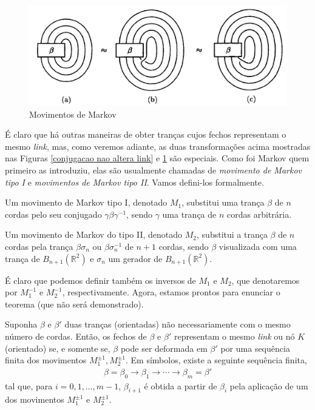 	\begin{figure}[H]
		\begin{center}
			\includegraphics[width=13cm]{Images/movimentos_de_markov.png}
		\end{center}\caption{Movimentos de Markov}
		\label{movimentos de Markov}
	\end{figure}
	É claro que há outras maneiras de obter tranças cujos fechos representam o mesmo \textit{link}, 
	mas, como veremos adiante, as duas transformações acima mostradas nas 
	Figuras \ref{conjugacao nao altera link} e \ref{movimentos de Markov} são especiais. 
	Como foi Markov quem primeiro as introduziu, elas são usualmente chamadas de 
	\textit{movimento de Markov tipo I} e \textit{movimentos de Markov tipo II}. 
	Vamos defini-los formalmente.
	\begin{definition}
		\label{def movimento de Markov tipo 1}
		Um movimento de Markov tipo I, denotado $M_1$, substitui uma trança $\beta$ de $n$ 
		cordas pelo seu conjugado $\gamma\beta\gamma^{-1}$, sendo $\gamma$ uma trança de $n$ 
		cordas arbitrária.  
	\end{definition}
	\begin{definition}
		\label{def movimento de Markov tipo 2}
		Um movimento de Markov do tipo II, denotado $M_2$, substitui a trança $\beta$ 
		de $n$ cordas pela trança $\beta\sigma_n$ ou $\beta\sigma_n^{-1}$ de $n+1$ cordas, 
		sendo $\beta$ visualizada com uma trança de $B_{n+1}(\mathbb{R}^2)$ e $\sigma_n$ 
		um gerador de $B_{n+1}(\mathbb{R}^2)$. 
	\end{definition}
	É claro que podemos definir também os inversos de $M_1$ e $M_2$, que denotaremos por 
	$M_1^{-1}$ e $M_2^{-1}$, respectivamente. Agora, estamos prontos para enunciar o 
	teorema (que não será demonstrado).
	\begin{theorem}[Markov]
		\label{teorema de Markov}
		Suponha $\beta$ e $\beta'$ duas tranças (orientadas) não necessariamente com o mesmo 
		número de cordas. Então, os fechos de $\beta$ e $\beta'$ representam o mesmo 
		\textit{link} ou nó $K$ (orientado) se, e somente se, $\beta$ pode ser deformada 
		em $\beta'$ por uma sequência finita dos movimentos $M_1^{\pm1}, M_2^{\pm1}$. 
		Em símbolos, existe a seguinte sequência finita,
		\begin{align*}
		    \beta = \beta_0\to\beta_1\to\cdots\to\beta_m = \beta'
		\end{align*}
		tal que, para $i = 0,1,\dots,m-1$, $\beta_{i+1}$ é obtida a partir de $\beta_i$ 
		pela aplicação de um dos movimentos $M_1^{\pm1}$ e $M_2^{\pm1}$.
	\end{theorem}
